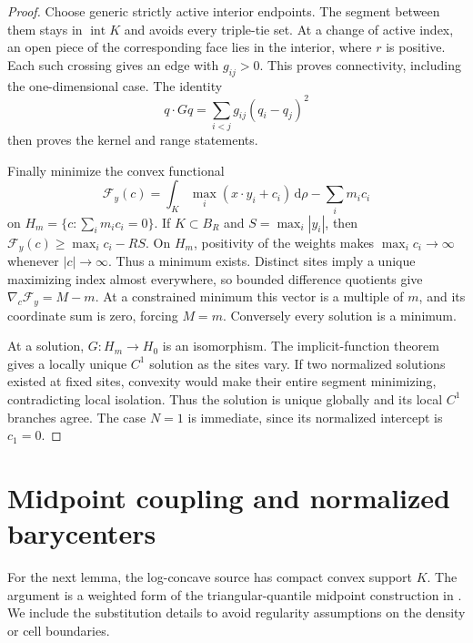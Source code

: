 \documentclass[11pt]{article}
\numberwithin{equation}{section}
\theoremstyle{remark}
\newcommand{\dd}{\,\mathrm d}
\newcommand{\interior}{\operatorname{int}}
\begin{document}
\begin{proof}
Choose generic strictly active interior endpoints. The segment between them stays in $\interior K$ and avoids every triple-tie set. At a change of active index, an open piece of the corresponding face lies in the interior, where $r$ is positive. Each such crossing gives an edge with $g_{ij}>0$. This proves connectivity, including the one-dimensional case. The identity
\[
 q\cdot Gq=\sum_{i<j}g_{ij}(q_i-q_j)^2
\]
then proves the kernel and range statements.

Finally minimize the convex functional
\[
 \mathcal F_y(c)=\int_K\max_i(x\cdot y_i+c_i)\dd\rho
                    -\sum_i m_ic_i
\]
on $H_m=\{c:\sum_i m_ic_i=0\}$. If $K\subset B_R$ and $S=\max_i|y_i|$, then $\mathcal F_y(c)\ge\max_i c_i-RS$. On $H_m$, positivity of the weights makes $\max_i c_i\to\infty$ whenever $|c|\to\infty$. Thus a minimum exists. Distinct sites imply a unique maximizing index almost everywhere, so bounded difference quotients give $\nabla_c\mathcal F_y=M-m$. At a constrained minimum this vector is a multiple of $m$, and its coordinate sum is zero, forcing $M=m$. Conversely every solution is a minimum.

At a solution, $G:H_m\to H_0$ is an isomorphism. The implicit-function theorem gives a locally unique $C^1$ solution as the sites vary. If two normalized solutions existed at fixed sites, convexity would make their entire segment minimizing, contradicting local isolation. Thus the solution is unique globally and its local $C^1$ branches agree. The case $N=1$ is immediate, since its normalized intercept is $c_1=0$.
\end{proof}

\section{Midpoint coupling and normalized barycenters}\label{sec:midpoint}
For the next lemma, the log-concave source has compact convex support $K$. The argument is a weighted form of the triangular-quantile midpoint construction in \cite{OpenAI2026}. We include the substitution details to avoid regularity assumptions on the density or cell boundaries.
\end{document}
